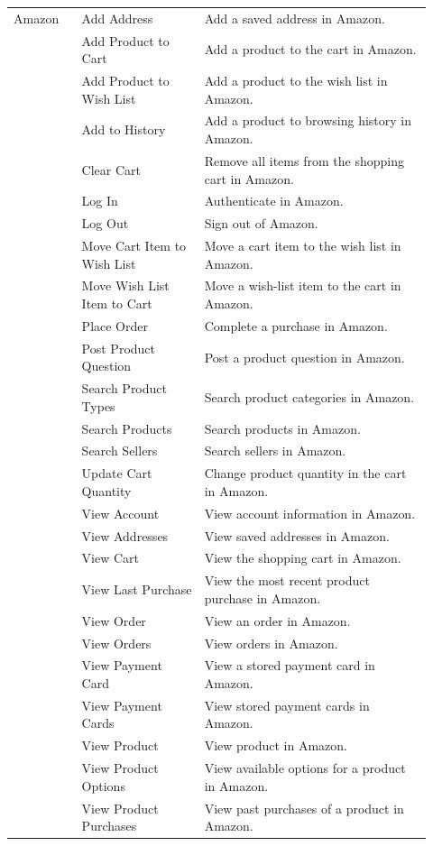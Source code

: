 \documentclass{llmxive}
\begin{document}
\begin{longtable}{@{}p{0.15\linewidth}p{0.27\linewidth}p{0.50\linewidth}@{}}
Amazon & Add Address & Add a saved address in Amazon. \\
 & Add Product to Cart & Add a product to the cart in Amazon. \\
 & Add Product to Wish List & Add a product to the wish list in Amazon. \\
 & Add to History & Add a product to browsing history in Amazon. \\
 & Clear Cart & Remove all items from the shopping cart in Amazon. \\
 & Log In & Authenticate in Amazon. \\
 & Log Out & Sign out of Amazon. \\
 & Move Cart Item to Wish List & Move a cart item to the wish list in Amazon. \\
 & Move Wish List Item to Cart & Move a wish-list item to the cart in Amazon. \\
 & Place Order & Complete a purchase in Amazon. \\
 & Post Product Question & Post a product question in Amazon. \\
 & Search Product Types & Search product categories in Amazon. \\
 & Search Products & Search products in Amazon. \\
 & Search Sellers & Search sellers in Amazon. \\
 & Update Cart Quantity & Change product quantity in the cart in Amazon. \\
 & View Account & View account information in Amazon. \\
 & View Addresses & View saved addresses in Amazon. \\
 & View Cart & View the shopping cart in Amazon. \\
 & View Last Purchase & View the most recent product purchase in Amazon. \\
 & View Order & View an order in Amazon. \\
 & View Orders & View orders in Amazon. \\
 & View Payment Card & View a stored payment card in Amazon. \\
 & View Payment Cards & View stored payment cards in Amazon. \\
 & View Product & View product in Amazon. \\
 & View Product Options & View available options for a product in Amazon. \\
 & View Product Purchases & View past purchases of a product in Amazon. \\

\end{longtable}
\end{document}
